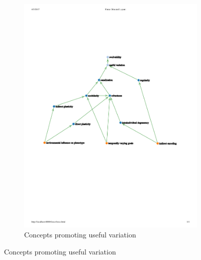 \begin{figure}
\begin{subfigure}[b]{0.45\textwidth}
        \includegraphics[width=\textwidth]{img/mindmap-useful-variation}
        \caption{Concepts promoting useful variation}
        \label{subfig:useful_variation}
    \end{subfigure}
    

\end{figure}
